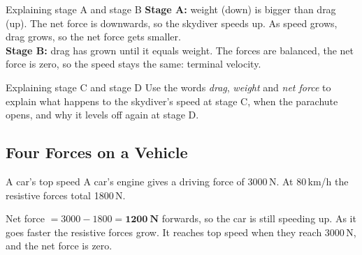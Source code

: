 \begin{center}
\end{center}

\begin{workedex}{Explaining stage A and stage B}
\textbf{Stage A:} weight (down) is bigger than drag (up). The net force is downwards, so the skydiver speeds up. As speed grows, drag grows, so the net force gets smaller.\\
\textbf{Stage B:} drag has grown until it equals weight. The forces are balanced, the net force is zero, so the speed stays the same: terminal velocity.
\end{workedex}

\begin{wedo}{Explaining stage C and stage D}
Use the words \emph{drag}, \emph{weight} and \emph{net force} to explain what happens to the skydiver's speed at stage C, when the parachute opens, and why it levels off again at stage D.
\end{wedo}

\subsection{Four Forces on a Vehicle}\label{sub:a2.2}

\begin{workedex}{A car's top speed}
A car's engine gives a driving force of 3000\,N. At 80\,km/h the resistive forces total 1800\,N.

\smallskip
Net force $= 3000 - 1800 = \mathbf{1200\ \text{N}}$ forwards, so the car is still speeding up. As it goes faster the resistive forces grow. It reaches top speed when they reach 3000\,N, and the net force is zero.
\end{workedex}

